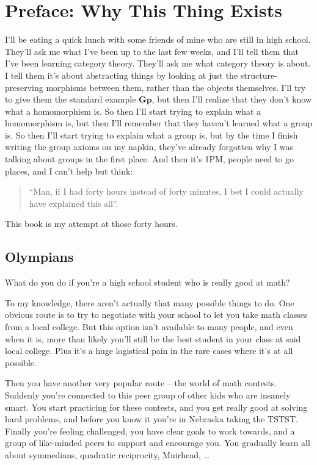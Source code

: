 \chapter*{Preface: Why This Thing Exists}
I'll be eating a quick lunch with some friends of mine who are still in high school.
They'll ask me what I've been up to the last few weeks, and I'll tell them that I've been learning category theory.
They'll ask me what category theory is about.
I tell them it's about abstracting things by looking at just the structure-preserving morphisms between them, rather than the objects themselves.
I'll try to give them the standard example $\mathbf{Gp}$, but then I'll realize that they don't know what a homomorphism is.
So then I'll start trying to explain what a homomorphism is, but then I'll remember that they haven't learned what a group is.
So then I'll start trying to explain what a group is, but by the time I finish writing the group axioms on my napkin, they've already forgotten why I was talking about groups in the first place.
And then it's 1PM, people need to go places, and I can't help but think:
\begin{quote}
	``Man, if I had forty hours instead of forty minutes, I bet I could actually have explained this all''.
\end{quote}
This book is my attempt at those forty hours.

\section*{Olympians}
What do you do if you're a high school student who is really good at math?

To my knowledge, there aren't actually that many possible things to do.
One obvious route is to try to negotiate with your school to let you take math classes from a local college. But this option isn't available to many people, and even when it is, more than likely you'll still be the best student in your class at said local college.
Plus it's a huge logistical pain in the rare cases where it's at all possible.

Then you have another very popular route -- the world of math contests.
Suddenly you're connected to this peer group of other kids who are insanely smart.
You start practicing for these contests, and you get really good at solving hard problems, and before you know it you're in Nebraska taking the TSTST.
Finally you're feeling challenged, you have clear goals to work towards, and a group of like-minded peers to support and encourage you.
You gradually learn all about symmedians, quadratic reciprocity, Muirhead, \dots

